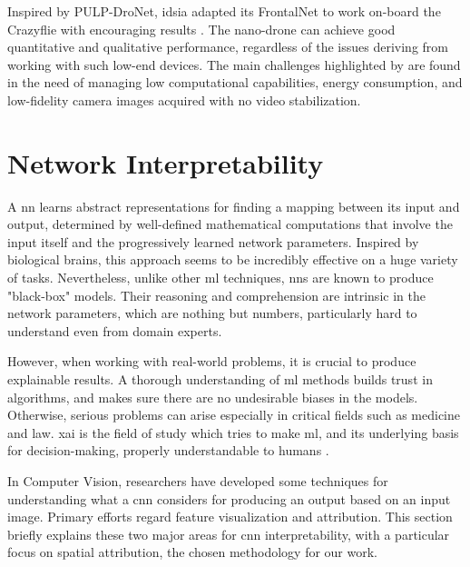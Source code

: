 Inspired by PULP-DroNet, \gls{idsia} adapted its FrontalNet \cite{mantegazza2019visionbased} to work on-board the Crazyflie with encouraging results \cite{zimmerman2020thesis}. The nano-drone can achieve good quantitative and qualitative performance, regardless of the issues deriving from working with such low-end devices. The main challenges highlighted by \cite{zimmerman2020thesis} are found in the need of managing low computational capabilities, energy consumption, and low-fidelity camera images acquired with no video stabilization.




\section{Network Interpretability}
\label{sec:network-interpretability}


A \gls{nn} learns abstract representations for finding a mapping between its input and output, determined by well-defined mathematical computations that involve the input itself and the progressively learned network parameters. Inspired by biological brains, this approach seems to be incredibly effective on a huge variety of tasks. Nevertheless, unlike other \gls{ml} techniques, \gls{nn}s are known to produce "black-box" models. Their reasoning and comprehension are intrinsic in the network parameters, which are nothing but numbers, particularly hard to understand even from domain experts. 

However, when working with real-world problems, it is crucial to produce explainable results. A thorough understanding of \gls{ml} methods builds trust in algorithms, and makes sure there are no undesirable biases in the models. Otherwise, serious problems can arise especially in critical fields such as medicine and law. \gls{xai} is the field of study which tries to make \gls{ml}, and its underlying basis for decision-making, properly understandable to humans \cite{xai-wiki}.

In Computer Vision, researchers have developed some techniques for understanding what a \gls{cnn} considers for producing an output based on an input image. Primary efforts regard feature visualization and attribution. This section briefly explains these two major areas for \gls{cnn} interpretability, with a particular focus on spatial attribution, the chosen methodology for our work.



